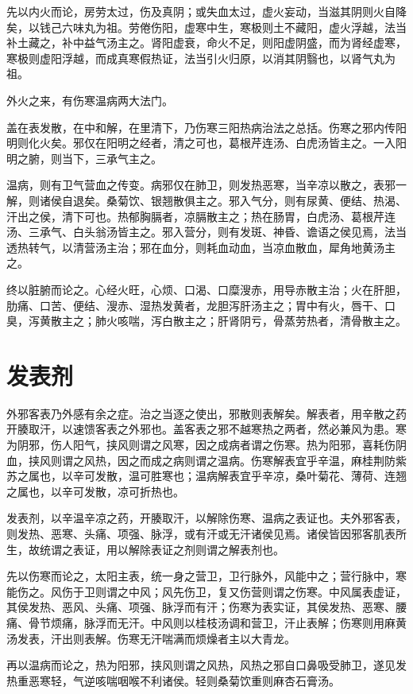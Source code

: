 \documentclass[UTF8]{ctexart}
\begin{document}
先以内火而论，房劳太过，伤及真阴；或失血太过，虚火妄动，当滋其阴则火自降矣，以钱己六味丸为祖。劳倦伤阳，虚寒中生，寒极则土不藏阳，虚火浮越，法当补土藏之，补中益气汤主之。肾阳虚衰，命火不足，则阳虚阴盛，而为肾经虚寒，寒极则虚阳浮越，而成真寒假热证，法当引火归原，以消其阴翳也，以肾气丸为祖。

外火之来，有伤寒温病两大法门。

盖在表发散，在中和解，在里清下，乃伤寒三阳热病治法之总括。伤寒之邪内传阳明则化火矣。邪仅在阳明之经者，清之可也，葛根芹连汤、白虎汤皆主之。一入阳明之腑，则当下，三承气主之。

温病，则有卫气营血之传变。病邪仅在肺卫，则发热恶寒，当辛凉以散之，表邪一解，则诸侯自退矣。桑菊饮、银翘散俱主之。邪入气分，则有尿黄、便结、热渴、汗出之侯，清下可也。热郁胸膈者，凉膈散主之；热在肠胃，白虎汤、葛根芹连汤、三承气、白头翁汤皆主之。邪入营分，则有发斑、神昏、谵语之侯见焉，法当透热转气，以清营汤主治；邪在血分，则耗血动血，当凉血散血，犀角地黄汤主之。

终以脏腑而论之。心经火旺，心烦、口渴、口糜溲赤，用导赤散主治；火在肝胆，肋痛、口苦、便结、溲赤、湿热发黄者，龙胆泻肝汤主之；胃中有火，唇干、口臭，泻黄散主之；肺火咳喘，泻白散主之；肝肾阴亏，骨蒸劳热者，清骨散主之。

\section{发表剂}
外邪客表乃外感有余之症。治之当逐之使出，邪散则表解矣。解表者，用辛散之药开腠取汗，以速馈客表之外邪也。盖客表之邪不越寒热之两者，然必兼风为患。寒为阴邪，伤人阳气，挟风则谓之风寒，因之成病者谓之伤寒。热为阳邪，喜耗伤阴血，挟风则谓之风热，因之而成之病则谓之温病。伤寒解表宜乎辛温，麻桂荆防紫苏之属也，以辛可发散，温可胜寒也；温病解表宜乎辛凉，桑叶菊花、薄荷、连翘之属也，以辛可发散，凉可折热也。

发表剂，以辛温辛凉之药，开腠取汗，以解除伤寒、温病之表证也。夫外邪客表，则发热、恶寒、头痛、项强、脉浮，或有汗或无汗诸侯见焉。诸侯皆因邪客肌表所生，故统谓之表证，用以解除表证之剂则谓之解表剂也。

先以伤寒而论之，太阳主表，统一身之营卫，卫行脉外，风能中之；营行脉中，寒能伤之。风伤于卫则谓之中风；风先伤卫，复又伤营则谓之伤寒。中风属表虚证，其侯发热、恶风、头痛、项强、脉浮而有汗；伤寒为表实证，其侯发热、恶寒、腰痛、骨节烦痛，脉浮而无汗。中风则以桂枝汤调和营卫，汗止表解；伤寒则用麻黄汤发表，汗出则表解。伤寒无汗喘满而烦燥者主以大青龙。

再以温病而论之，热为阳邪，挟风则谓之风热，风热之邪自口鼻吸受肺卫，遂见发热重恶寒轻，气逆咳喘咽喉不利诸侯。轻则桑菊饮重则麻杏石膏汤。
\end{document}
